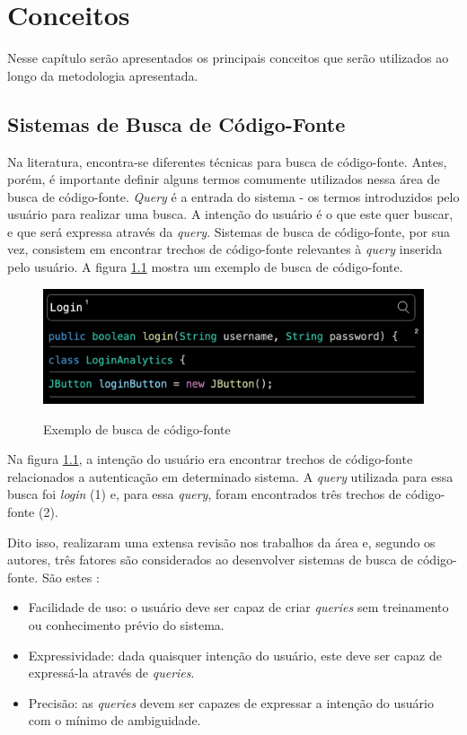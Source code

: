 \chapter{Conceitos}
\label{chp:concepts}
Nesse capítulo serão apresentados os principais conceitos que serão utilizados ao longo da metodologia apresentada.

\section{Sistemas de Busca de Código-Fonte}
Na literatura, encontra-se diferentes técnicas para busca de código-fonte. Antes, porém, é importante definir alguns termos comumente utilizados nessa área de busca de código-fonte. \textit{Query} é a entrada do sistema - os termos introduzidos pelo usuário para realizar uma busca. A intenção do usuário é o que este quer buscar, e que será expressa através da \textit{query}. Sistemas de busca de código-fonte, por sua vez, consistem em encontrar trechos de código-fonte relevantes à \textit{query} inserida pelo usuário. A figura \ref{fig:concepts:code-search-structure} mostra um exemplo de busca de código-fonte.

\begin{figure}[H]
    \centering
    \caption{Exemplo de busca de código-fonte}
    \includegraphics[width=\textwidth,keepaspectratio=true]{resources/images/conceitos/code-search-structure.png}
    \label{fig:concepts:code-search-structure}
\end{figure}

Na figura \ref{fig:concepts:code-search-structure}, a intenção do usuário era encontrar trechos de código-fonte relacionados a autenticação em determinado sistema. A \textit{query} utilizada para essa busca foi \textit{login} (1) e, para essa \textit{query}, foram encontrados três trechos de código-fonte (2).

Dito isso, \textcite{Grazia2022CodeSA} realizaram uma extensa revisão nos trabalhos da área e, segundo os autores, três fatores são considerados ao desenvolver sistemas de busca de código-fonte. São estes \cite{Grazia2022CodeSA}:
\begin{itemize}
  \item Facilidade de uso: o usuário deve ser capaz de criar \textit{queries} sem treinamento ou conhecimento prévio do sistema.
  \item Expressividade: dada quaisquer intenção do usuário, este deve ser capaz de expressá-la através de \textit{queries}.
  \item Precisão: as \textit{queries} devem ser capazes de expressar a intenção do usuário com o mínimo de ambiguidade.
\end{itemize}


